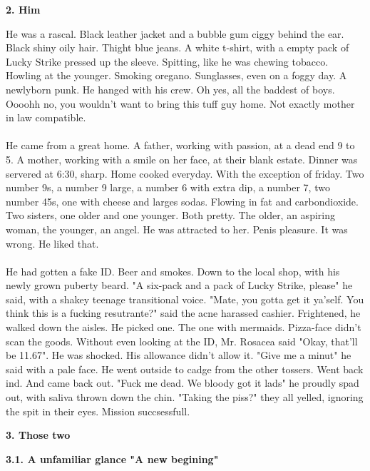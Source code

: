 \documentclass[]{article}
\begin{document}
\begin{center}
	\large\textbf{2. Him}
\end{center}

He was a rascal. Black leather jacket and a bubble gum ciggy behind the ear. Black shiny oily hair. Thight blue jeans. A white t-shirt, with a empty pack of Lucky Strike pressed up the sleeve. Spitting, like he was chewing tobacco. Howling at the younger. Smoking oregano. Sunglasses, even on a foggy day. A newlyborn punk. He hanged with his crew. Oh yes, all the baddest of boys. Oooohh no, you wouldn't want to bring this tuff guy home. Not exactly mother in law compatible. 
\\ \\
He came from a great home. A father, working with passion, at a dead end 9 to 5. A mother, working with a smile on her face, at their blank estate. Dinner was servered at 6:30, sharp. Home cooked everyday. With the exception of friday. Two number 9s, a number 9 large, a number 6 with extra dip, a number 7, two number 45s, one with cheese and larges sodas. Flowing in fat and carbondioxide. Two sisters, one older and one younger. Both pretty. The older, an aspiring woman, the younger, an angel. He was attracted to her. Penis pleasure. It was wrong. He liked that.
\\ \\
He had gotten a fake ID. Beer and smokes. Down to the local shop, with his newly grown puberty beard. "A six-pack and a pack of Lucky Strike, please" he said, with a shakey teenage transitional voice. "Mate, you gotta get it ya'self. You think this is a fucking resutrante?" said the acne harassed cashier. Frightened, he walked down the aisles. He picked one. The one with mermaids. Pizza-face didn't scan the goods. Without even looking at the ID, Mr. Rosacea said "Okay, that'll be 11.67". He was shocked. His allowance didn't allow it. "Give me a minut" he said with a pale face. He went outside to cadge from the other tossers. Went back ind. And came back out. "Fuck me dead. We bloody got it lads" he proudly spad out, with saliva thrown down the chin. "Taking the piss?" they all yelled, ignoring the spit in their eyes. Mission succsessfull.

\newpage

\begin{center}
	\large\textbf{3. Those two}
\end{center}

\begin{center}
	\textbf{3.1. A unfamiliar glance "A new begining"}
\end{center}
\end{document}
